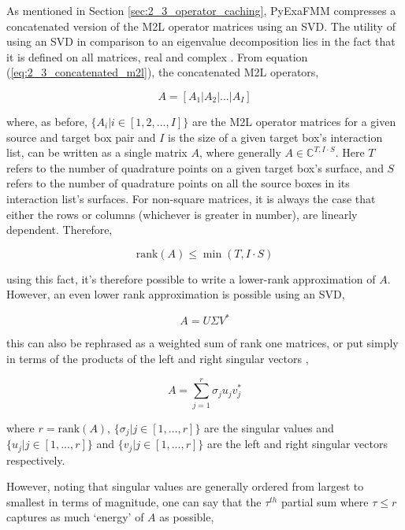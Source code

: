 As mentioned in Section \ref{sec:2_3_operator_caching}, \gls{PyExaFMM} compresses
a concatenated version of the \gls{M2L} operator matrices using an \gls{SVD}.
The utility of using an SVD in comparison to an eigenvalue decomposition lies
in the fact that it is defined on all matrices, real and complex
\cite{Trefethen:1997:SIAM}. From equation (\ref{eq:2_3_concatenated_m2l}), the
concatenated M2L operators,

\begin{equation}
    A = \left [ A_1 | A_2 | ... | A_I \right]
\end{equation}

where, as before, $\{A_i | i \in [1, 2, ..., I]\}$ are the M2L operator matrices
for a given source and target box pair and $I$ is the size of a given target box's
interaction list, can be written as a single matrix $A$, where generally
$A \in \mathbb{C}^{T, I \cdot S}$. Here $T$ refers to the number of quadrature
points on a given target box's surface, and $S$ refers to the number of quadrature
points on all the source boxes in its interaction list's surfaces. For non-square
matrices, it is always the case that either the rows or columns (whichever is
greater in number), are linearly dependent. Therefore,

\begin{equation}
    \text{rank}(A) \leq \min (T, I \cdot S)
\end{equation}

using this fact, it's therefore possible to write a lower-rank approximation of $A$.
However, an even lower rank approximation is possible using an SVD,

\begin{equation}
    A = U \Sigma V^*
\end{equation}

this can also be rephrased as a weighted sum of rank one matrices, or put simply
in terms of the products of the left and right singular vectors \cite{Trefethen:1997:SIAM},

\begin{equation}
    A = \sum_{j=1}^{r}\sigma_j u_j v_j^*
\end{equation}

where $r = \text{rank} (A)$, $\{\sigma_j | j \in [1, ..., r] \}$ are the singular
values and $\{u_j | j \in [1, ..., r] \} $ and $\{v_j | j \in [1, ..., r] \}$
are the left and right singular vectors respectively.

However, noting that singular values are generally ordered from largest to smallest
in terms of magnitude, one can say that the $\tau^{th}$ partial sum where
$\tau \leq r$ captures as much `energy' of $A$ as possible,

